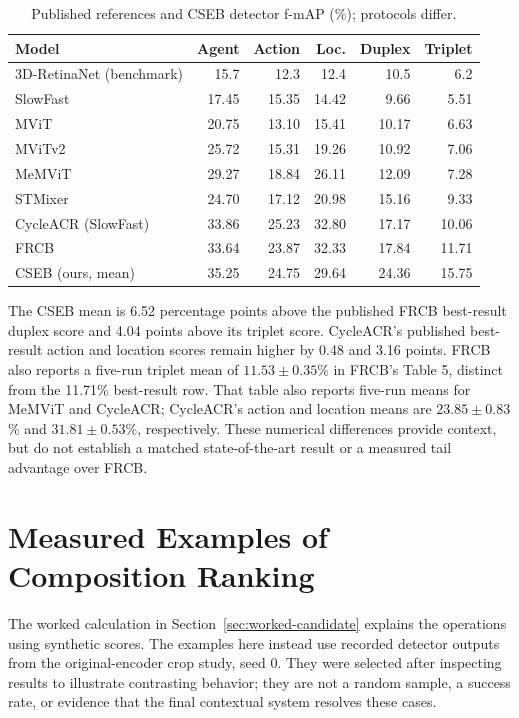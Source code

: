 \begin{table}[htbp]
\centering
\caption{Published references and CSEB detector f-mAP (\%); protocols differ.}
\label{tab:published}
\begin{singlespace}
\begin{tabularx}{\textwidth}{@{}Xrrrrr@{}}
\toprule
\textbf{Model} & \textbf{Agent} & \textbf{Action} & \textbf{Loc.} & \textbf{Duplex} & \textbf{Triplet} \\
\midrule
3D-RetinaNet (benchmark) & 15.7 & 12.3 & 12.4 & 10.5 & 6.2 \\
SlowFast & 17.45 & 15.35 & 14.42 & 9.66 & 5.51 \\
MViT & 20.75 & 13.10 & 15.41 & 10.17 & 6.63 \\
MViTv2 & 25.72 & 15.31 & 19.26 & 10.92 & 7.06 \\
MeMViT & 29.27 & 18.84 & 26.11 & 12.09 & 7.28 \\
STMixer & 24.70 & 17.12 & 20.98 & 15.16 & 9.33 \\
CycleACR (SlowFast) & 33.86 & 25.23 & 32.80 & 17.17 & 10.06 \\
FRCB & 33.64 & 23.87 & 32.33 & 17.84 & 11.71 \\
CSEB (ours, mean) & 35.25 & 24.75 & 29.64 & 24.36 & 15.75 \\
\bottomrule
\end{tabularx}
\end{singlespace}
\end{table}

The CSEB mean is 6.52 percentage points above the published FRCB best-result duplex score and 4.04 points above its triplet score. CycleACR's published best-result action and location scores remain higher by 0.48 and 3.16 points. FRCB also reports a five-run triplet mean of \(11.53\pm0.35\)\% in FRCB's Table 5, distinct from the 11.71\% best-result row. That table also reports five-run means for MeMViT and CycleACR; CycleACR's action and location means are \(23.85\pm0.83\)\% and \(31.81\pm0.53\)\%, respectively. These numerical differences provide context, but do not establish a matched state-of-the-art result or a measured tail advantage over FRCB.

\section{Measured Examples of Composition Ranking}
\label{sec:measured-examples}

The worked calculation in Section~\ref{sec:worked-candidate} explains the operations using synthetic scores. The examples here instead use recorded detector outputs from the original-encoder crop study, seed 0. They were selected after inspecting results to illustrate contrasting behavior; they are not a random sample, a success rate, or evidence that the final contextual system resolves these cases.

